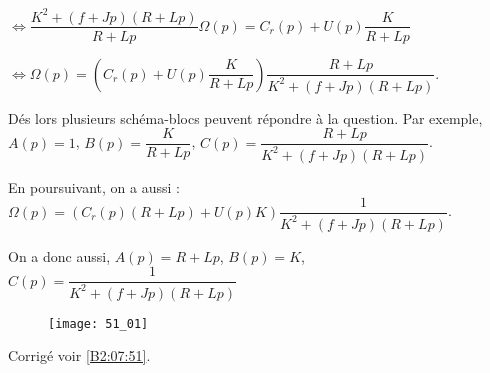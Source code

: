 $\Leftrightarrow \dfrac{K^2+\left(f+Jp \right)\left(R+Lp \right)}{R+Lp}\Omega(p)  = C_r(p) + U(p)\dfrac{K}{R+Lp} $

$\Leftrightarrow \Omega(p)  = \left(C_r(p) + U(p)\dfrac{K}{R+Lp}\right)\dfrac{R+Lp}{K^2+\left(f+Jp \right)\left(R+Lp \right)} $.

Dés lors plusieurs schéma-blocs peuvent répondre à la question. Par exemple, $A(p)=1$, $B(p)=\dfrac{K}{R+Lp}$, $C(p)=\dfrac{R+Lp}{K^2+\left(f+Jp \right)\left(R+Lp \right)}$.

En poursuivant, on a aussi : 
$ \Omega(p)  = \left(C_r(p)(R+Lp) + U(p) K\right)\dfrac{1}{K^2+\left(f+Jp \right)\left(R+Lp \right)} $.

On a donc aussi,  $A(p)=R+Lp$, $B(p)={K}$, $C(p)=\dfrac{1}{K^2+\left(f+Jp \right)\left(R+Lp \right)}$



\else
\begin{figure}[H]
\centering
\texttt{[image: 51\_01]}
\end{figure}
\fi





\ifprof
\else

\ifcolle
\else
\noindent\footnotesize
{}
\normalsize
\fi
\begin{flushright}
\footnotesize{Corrigé  voir \ref{B2:07:51}.}
\end{flushright}%
\fi
